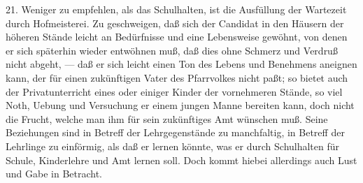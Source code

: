 21. Weniger zu empfehlen, als das Schulhalten, ist die Ausfüllung der Wartezeit durch Hofmeisterei. Zu geschweigen, daß sich der Candidat in den Häusern der höheren
Stände leicht an Bedürfnisse und eine Lebensweise gewöhnt, von denen er sich späterhin wieder entwöhnen muß, daß dies ohne Schmerz und Verdruß nicht abgeht, — daß er sich leicht einen Ton des Lebens und Benehmens aneignen kann, der für einen zukünftigen Vater des Pfarrvolkes nicht paßt; so bietet auch der Privatunterricht eines oder einiger Kinder der vornehmeren Stände, so viel Noth, Uebung und Versuchung er einem jungen Manne bereiten kann, doch nicht die Frucht, welche man ihm für sein zukünftiges Amt wünschen muß. Seine Beziehungen sind in Betreff der Lehrgegenstände zu manchfaltig, in Betreff der Lehrlinge zu einförmig, als daß er lernen könnte, was er durch Schulhalten für Schule, Kinderlehre und Amt lernen soll. Doch kommt hiebei allerdings auch Lust und Gabe in Betracht.

